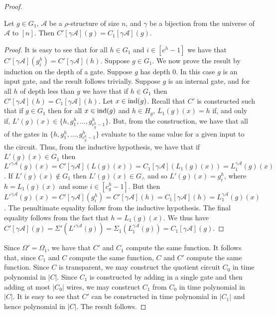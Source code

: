 \documentclass[../main/thesis.tex]{subfiles}
\begin{document}
\begin{proof}
  \begin{claim}
    Let $g \in G_1$, $\mathcal{A}$ be a $\rho$-structure of size $n$, and
    $\gamma$ be a bijection from the universe of $\mathcal{A}$ to $[n]$. Then
    $C'[\gamma \mathcal{A}](g) = C_1[\gamma \mathcal{A}](g)$.
  \end{claim}
  \begin{proof}
    It is easy to see that for all $h \in G_1$ and $i \in [c^h-1]$ we have that
    $C'[\gamma \mathcal{A}](g^h_i) = C'[\gamma \mathcal{A}](h)$. Suppose $g \in
    G_1$. We now prove the result by induction on the depth of a gate. Suppose
    $g$ has depth $0$. In this case $g$ is an input gate, and the result follows
    trivially. Suppose $g$ is an internal gate, and for all $h$ of depth less
    than $g$ we have that if $h \in G_1$ then $C'[\gamma \mathcal{A}](h) =
    C_1[\gamma \mathcal{A}](h)$. Let $x \in \text{\upshape ind}(g)$. Recall that $C'$ is
    constructed such that if $g \in G_1$ then for all $x \in \text{\upshape ind}(g)$ and $h \in
    H_g$, $L_1(g)(x) = h$ if, and only if, $L'(g)(x) \in \{h, g^h_1, \ldots ,
    g^h_{c^h_g - 1}\}$. But, from the construction, we have that all of the
    gates in $\{h, g^h_1, \ldots, g^h_{c^h_g -1}\}$ evaluate to the same value
    for a given input to the circuit. Thus, from the inductive hypothesis, we
    have that if $L'(g)(x) \in G_1$ then $ {L'}^{\gamma \mathcal{A}}(g)(x) =
    C'[\gamma \mathcal{A}](L(g)(x)) = C_1[\gamma \mathcal{A}](L_1(g)(x)) =
    L^{\gamma \mathcal{A}}_1(g)(x) $. If $L'(g)(x) \not\in G_1$ then $L'(g)(x)
    \in G_{\land}$ and so $L'(g)(x) = g^h_i$, where $h = L_1(g)(x)$ and some $i
    \in [c^h_g -1]$. But then ${L'}^{\gamma \mathcal{A}}(g)(x) = C'[\gamma
    \mathcal{A}](g^h_i) = C'[\gamma \mathcal{A}](h) = C_1[\gamma \mathcal{A}](h)
    = L^{\gamma \mathcal{A}}_1(g)(x)$. The penultimate equality follow from the
    inductive hypothesis. The final equality follows from the fact that $h = L_1
    (g)(x)$. We thus have $C'[\gamma \mathcal{A}](g) = \Sigma'({L'}^{\gamma
      \mathcal{A}}(g)) = \Sigma_1 (L^{\gamma \mathcal{A}}_1(g)) = C_1[\gamma
    \mathcal{A}](g)$.
  \end{proof}

  Since $\Omega' = \Omega_1$, we have that $C'$ and $C_1$ compute the same
  function. It follows that, since $C_1$ and $C$ compute the same function, $C$
  and $C'$ compute the same function. Since $C$ is transparent, we may construct
  the quotient circuit $C_0$ in time polynomial in $\vert C \vert$. Since $C_1$
  is constructed by adding in a single gate and then adding at most $\vert C_0
  \vert$ wires, we may construct $C_1$ from $C_0$ in time polynomial in $\vert C
  \vert$. It is easy to see that $C'$ can be constructed in time polynomial in
  $\vert C_1 \vert$ and hence polynomial in $\vert C \vert$. The result follows.
\end{proof}
\end{document}
